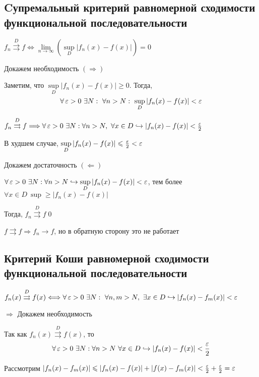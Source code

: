 \documentclass[a4paper]{article}
\begin{document}
\subsection{Cупремальный критерий равномерной сходимости функциональной последовательности}
\theorem $f_n\overset{D}{\rightrightarrows} f\Longleftrightarrow \lim\limits_{n\to\infty}\left(\sup\limits_{D} \left|f_n(x)-f(x)\right|\right)=0$

\proof Докажем необходимость $(\Longrightarrow)$

Заметим, что $\sup\limits_{D} \left|f_n(x)-f(x)\right|\geqslant 0$. Тогда,
\begin{equation*}
    \forall\ve >0\ \exists N:\ \forall n>N:\ \sup\limits_D |f_n(x)-f(x)|<\ve
\end{equation*}

$f_n\overset{D}{\rightrightarrows} f\Longrightarrow \forall\operatorname{\varepsilon}>0\ \exists N:\forall n>N,\ \forall x\in D\hookrightarrow|f_n(x)-f(x)|<\frac{\operatorname{\varepsilon}}{2}$

В худшем случае, $\sup\limits_{D} |f_n(x)-f(x)|\leqslant \frac{\operatorname{\varepsilon}}{2}<\operatorname{\varepsilon}$

\proof Докажем достаточность $(\Longleftarrow)$

$\forall \operatorname{\varepsilon}>0\ \exists N:\forall n>N\hookrightarrow\sup\limits_{D}|f_n(x)-f(x)|<\operatorname{\varepsilon}$, тем более $\forall x\in D\ \sup \geqslant |f_n(x)-f(x)|$ 

Тогда, $f_n\overset{D}{\rightrightarrows} f$\qed 

\comment $f\rightrightarrows f\Longrightarrow f_n\longrightarrow f$, но в обратную сторону это не работает


\subsection{Критерий Коши равномерной сходимости функциональной последовательности}
\theorem $f_n(x)\overset{D}{\rightrightarrows} f(x)\Longleftrightarrow\forall\ve>0\ \exists N:\ \forall n,m>N,\ \exists x\in D\hookrightarrow |f_n(x)-f_m(x)|<\ve$

\proof $\Longrightarrow$ Докажем необходимость

Так как $f_n(x)\overset{D}{\rightrightarrows} f(x)$, то
\begin{equation*}
    \forall\operatorname{\varepsilon}>0\ \exists N:\forall n>N\ \forall x\in D\hookrightarrow |f_n(x)-f(x)|<\frac{\operatorname{\varepsilon}}{2}
\end{equation*}

Рассмотрим $|f_n(x)-f_m(x)|\leqslant |f_n(x)-f(x)|+|f(x)-f_m(x)|<\frac{\operatorname{\varepsilon}}{2}+\frac{\operatorname{\varepsilon}}{2}=\operatorname{\varepsilon}$
\end{document}
